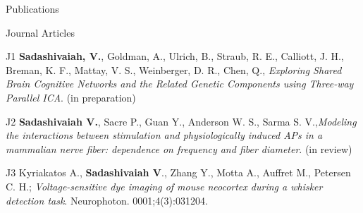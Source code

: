 \documentclass{resume}
\begin{document}
\begin{rSection}{Publications}
\begin{rSubsection}{Journal Articles}{}{}{}
\item [J1] \textbf{Sadashivaiah, V.}, Goldman, A., Ulrich, B., Straub, R. E., Calliott, J. H., Breman, K. F., Mattay, V. S., Weinberger, D. R., Chen, Q., \textit{Exploring Shared Brain Cognitive Networks and the Related Genetic Components using Three-way Parallel ICA}. (in preparation) \newline
\item [J2] \textbf{Sadashivaiah V.}, Sacre P., Guan Y., Anderson W. S., Sarma S. V.,\textit{Modeling the interactions between stimulation and physiologically induced APs in a mammalian nerve fiber: dependence on frequency and fiber diameter}. (in review)\newline
\item [J3]  Kyriakatos A., \textbf{Sadashivaiah V}., Zhang Y., Motta A., Auffret M., Petersen C. H.; \textit{Voltage-sensitive dye imaging of mouse neocortex during a whisker detection task}. Neurophoton. 0001;4(3):031204.
 \end{rSubsection}


\end{rSection}
\end{document}

